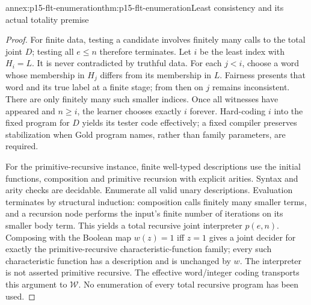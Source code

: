 \begin{annexitem}{annex:p15-flt-enumeration}{thm:p15-flt-enumeration}{Least consistency and its actual totality premise}
\begin{proof}
For finite data, testing a candidate involves finitely many
calls to the total joint \(D\); testing all \(e\leq n\)
therefore terminates. Let \(i\) be the least index with
\(H_i=L\). It is never contradicted by truthful data.
For each \(j<i\), choose a word whose membership in
\(H_j\) differs from its membership in \(L\).
Fairness presents that word and its true label at a finite
stage; from then on \(j\) remains inconsistent.
There are only finitely many such smaller indices.
Once all witnesses have appeared and \(n\geq i\),
the learner chooses exactly \(i\) forever.
Hard-coding \(i\) into the fixed program for \(D\) yields
its tester code effectively; a fixed compiler preserves
stabilization when Gold program names, rather than family
parameters, are required.

For the primitive-recursive instance, finite well-typed
descriptions use the initial functions, composition and
primitive recursion with explicit arities.
Syntax and arity checks are decidable. Enumerate all valid
unary descriptions. Evaluation terminates by structural
induction: composition calls finitely many smaller terms,
and a recursion node performs the input's finite number
of iterations on its smaller body term.
This yields a total recursive joint interpreter \(p(e,n)\).
Composing with the Boolean map \(w(z)=1\) iff \(z=1\)
gives a joint decider for exactly the primitive-recursive
characteristic-function family; every such characteristic
function has a description and is unchanged by \(w\).
The interpreter is not asserted primitive recursive.
The effective word/integer coding transports this argument
to \(\mathcal W\). No enumeration of every total recursive
program has been used.
\end{proof}
\end{annexitem}

